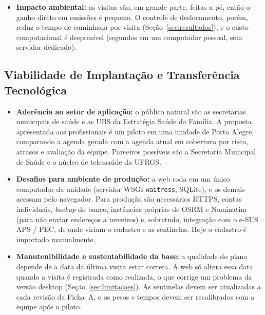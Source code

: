 \documentclass[11pt,a4paper]{article}
\begin{document}
\begin{itemize}
\begin{itemize}
        \item \textbf{Rastreabilidade e explicabilidade:} o algoritmo é determinístico para uma semente, a recompensa tem forma fechada (Eq.~\ref{eq:recompensa}) e a web guarda o histórico de planos com as famílias, as prioridades e o relatório usados em cada um. Isso permite explicar por que uma família entrou ou ficou de fora.
    \end{itemize}
    \item \textbf{Impacto ambiental:} as visitas são, em grande parte, feitas a pé, então o ganho direto em emissões é pequeno. O controle de deslocamento, porém, reduz o tempo de caminhada por visita (Seção~\ref{sec:resultados}), e o custo computacional é desprezível (segundos em um computador pessoal, sem servidor dedicado).
\end{itemize}

\subsection{Viabilidade de Implantação e Transferência Tecnológica}
\begin{itemize}
    \item \textbf{Aderência ao setor de aplicação:} o público natural são as secretarias municipais de saúde e as UBS da Estratégia Saúde da Família. A proposta apresentada aos profissionais é um piloto em uma unidade de Porto Alegre, comparando a agenda gerada com a agenda atual em cobertura por risco, atrasos e avaliação da equipe. Parceiros possíveis são a Secretaria Municipal de Saúde e o núcleo de telessaúde da UFRGS.
    \item \textbf{Desafios para ambiente de produção:} a web roda em um único computador da unidade (servidor WSGI \texttt{waitress}, SQLite), e os demais acessam pelo navegador. Para produção são necessários HTTPS, contas individuais, \emph{backup} do banco, instâncias próprias de OSRM e Nominatim (para não enviar endereços a terceiros) e, sobretudo, integração com o e-SUS APS / PEC, de onde viriam o cadastro e as sentinelas. Hoje o cadastro é importado manualmente.
    \item \textbf{Manutenibilidade e sustentabilidade da base:} a qualidade do plano depende de a data da última visita estar correta. A web só altera essa data quando a visita é registrada como realizada, o que corrige um problema da versão desktop (Seção~\ref{sec:limitacoes}). As sentinelas devem ser atualizadas a cada revisão da Ficha~A, e os pesos e tempos devem ser recalibrados com a equipe após o piloto.
\end{itemize}
\end{document}
